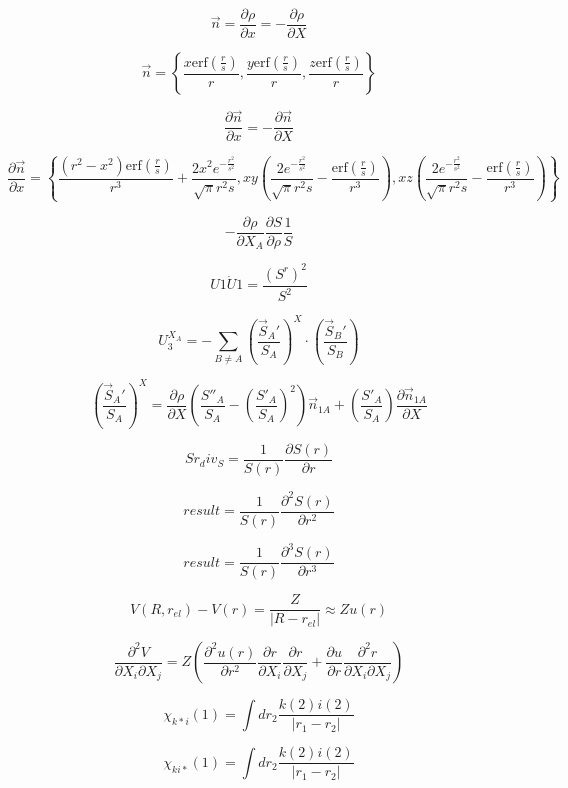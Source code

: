 \documentclass{article}
\begin{document}
\[ \vec n = \frac{\partial \rho}{\partial x} = -\frac{\partial \rho}{\partial X} \]
\pagebreak

\[ \vec n = \left\{\frac{x \mathrm{erf}\left(\frac{r}{s}\right)}{r}, \frac{y \mathrm{erf}\left(\frac{r}{s}\right)}{r}, \frac{z \mathrm{erf}\left(\frac{r}{s}\right)}{r}\right\} \]
\pagebreak

\[ \frac{\partial \vec n}{\partial x} = -\frac{\partial \vec n}{\partial X} \]
\pagebreak

\[ \frac{\partial\vec n}{\partial x} = \left\{\frac{\left(r^2-x^2\right) \mathrm{erf}\left(\frac{r}{s}\right)}{r^3} +\frac{2 x^2 e^{-\frac{r^2}{s^2}}}{\sqrt{\pi } r^2 s}, x y \left(\frac{2 e^{-\frac{r^2}{s^2}}}{\sqrt{\pi } r^2 s} -\frac{\mathrm{erf}\left(\frac{r}{s}\right)}{r^3}\right), x z \left(\frac{2 e^{-\frac{r^2}{s^2}}}{\sqrt{\pi } r^2 s} -\frac{\mathrm{erf}\left(\frac{r}{s}\right)}{r^3}\right)\right\} \]
\pagebreak

\[ -\frac{\partial \rho}{\partial X_A}\frac{\partial S}{\partial \rho}\frac{1}{S} \]
\pagebreak

\[ U1\dot U1 = \frac{\left(S^r\right)^2}{S^2} \]
\pagebreak

\[ U_3^{X_A} = -\sum_{B\neq A}\left(\frac{\vec S_A'}{S_A}\right)^X\cdot\left(\frac{\vec S_B'}{S_B}\right) \]
\pagebreak

\[ \left(\frac{\vec S_A'}{S_A}\right)^X = \frac{\partial \rho}{\partial X}\left(\frac{S''_A}{S_A} -\left(\frac{S'_A}{S_A}\right)^2\right)\vec n_{1A} + \left(\frac{S'_A}{S_A}\right)\frac{\partial \vec n_{1A}}{\partial X} \]
\pagebreak

\[ Sr_div_S = \frac{1}{S(r)}\frac{\partial S(r)}{\partial r} \]
\pagebreak

\[ result = \frac{1}{S(r)}\frac{\partial^2 S(r)}{\partial r^2} \]
\pagebreak

\[ result = \frac{1}{S(r)}\frac{\partial^3 S(r)}{\partial r^3} \]
\pagebreak

\[ V(R,r_{el}) -V(r) =\frac{Z}{|R-r_{el}|} \approx Z u(r) \]
\pagebreak

\[ \frac{\partial^2 V}{\partial X_i\partial X_j} = Z \left(\frac{\partial^2 u(r)}{\partial r^2} \frac{\partial r}{\partial X_i} \frac{\partial r}{\partial X_j} + \frac{\partial u}{\partial r} \frac{\partial^2 r}{\partial X_i \partial X_j}\right) \]
\pagebreak

\[ \chi_{k{*} i}(1) = \int dr_2 \frac{k(2) i(2)}{|r_1-r_2|} \]
\pagebreak

\[ \chi_{ki{*}}(1) = \int dr_2 \frac{k(2) i(2)}{|r_1-r_2|} \]
\pagebreak
\end{document}
